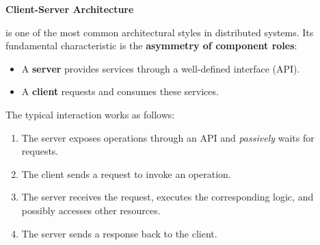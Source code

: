 \highspace
\begin{flushleft}
    \textcolor{Green3}{ \textbf{Client-Server Architecture}}
\end{flushleft}
 is one of the most common architectural styles in distributed systems. Its fundamental characteristic is the \textbf{asymmetry of component roles}:
\begin{itemize}
    \item A \textbf{server} provides services through a well-defined interface (API).
    \item A \textbf{client} requests and consumes these services.
\end{itemize}
The typical interaction works as follows:
\begin{enumerate}
    \item The server exposes operations through an API and \emph{passively} waits for requests.
    \item The client sends a request to invoke an operation.
    \item The server receives the request, executes the corresponding logic, and possibly accesses other resources.
    \item The server sends a response back to the client.
\end{enumerate}

